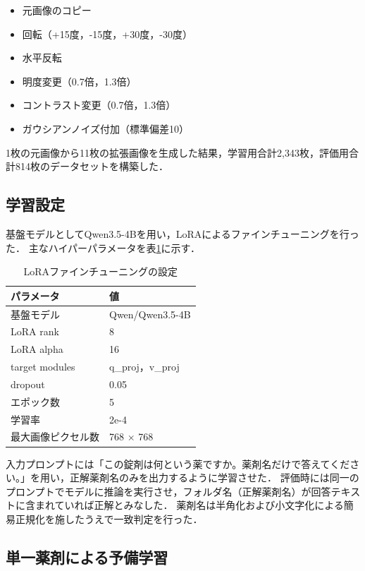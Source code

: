 \documentclass{jsarticle}
\begin{document}
\begin{itemize}
  \item 元画像のコピー
  \item 回転（+15度，-15度，+30度，-30度）
  \item 水平反転
  \item 明度変更（0.7倍，1.3倍）
  \item コントラスト変更（0.7倍，1.3倍）
  \item ガウシアンノイズ付加（標準偏差10）
\end{itemize}

1枚の元画像から11枚の拡張画像を生成した結果，学習用合計2,343枚，評価用合計814枚のデータセットを構築した．

\subsection{学習設定}

基盤モデルとしてQwen3.5-4Bを用い，LoRAによるファインチューニングを行った．
主なハイパーパラメータを表\ref{tab:lora_config}に示す．

\begin{table}[h]
\centering
\caption{LoRAファインチューニングの設定}
\label{tab:lora_config}
\begin{tabular}{ll}
\hline
パラメータ & 値 \\
\hline
基盤モデル & Qwen/Qwen3.5-4B \\
LoRA rank & 8 \\
LoRA alpha & 16 \\
target modules & q\_proj，v\_proj \\
dropout & 0.05 \\
エポック数 & 5 \\
学習率 & 2e-4 \\
最大画像ピクセル数 & 768 $\times$ 768 \\
\hline
\end{tabular}
\end{table}

入力プロンプトには「この錠剤は何という薬ですか。薬剤名だけで答えてください。」を用い，正解薬剤名のみを出力するように学習させた．
評価時には同一のプロンプトでモデルに推論を実行させ，フォルダ名（正解薬剤名）が回答テキストに含まれていれば正解とみなした．
薬剤名は半角化および小文字化による簡易正規化を施したうえで一致判定を行った．

\subsection{単一薬剤による予備学習}
\end{document}
